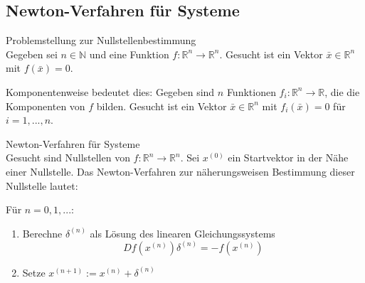 \subsection{Newton-Verfahren für Systeme}

\begin{definition}{Problemstellung zur Nullstellenbestimmung}\\
Gegeben sei $n \in \mathbb{N}$ und eine Funktion $f: \mathbb{R}^n \rightarrow \mathbb{R}^n$. Gesucht ist ein Vektor $\bar{x} \in \mathbb{R}^n$ mit $f(\bar{x}) = 0$.

Komponentenweise bedeutet dies: Gegeben sind $n$ Funktionen $f_i: \mathbb{R}^n \rightarrow \mathbb{R}$, die die Komponenten von $f$ bilden. Gesucht ist ein Vektor $\bar{x} \in \mathbb{R}^n$ mit $f_i(\bar{x}) = 0$ für $i = 1, ..., n$.
\end{definition}

\begin{theorem}{Newton-Verfahren für Systeme}\\
Gesucht sind Nullstellen von $f: \mathbb{R}^n \rightarrow \mathbb{R}^n$. Sei $x^{(0)}$ ein Startvektor in der Nähe einer Nullstelle. Das Newton-Verfahren zur näherungsweisen Bestimmung dieser Nullstelle lautet:

Für $n = 0, 1, ...$:
\begin{enumerate}
    \item Berechne $\delta^{(n)}$ als Lösung des linearen Gleichungssystems
    $$Df(x^{(n)}) \delta^{(n)} = -f(x^{(n)})$$
    \item Setze $x^{(n+1)} := x^{(n)} + \delta^{(n)}$
\end{enumerate}
\end{theorem}

